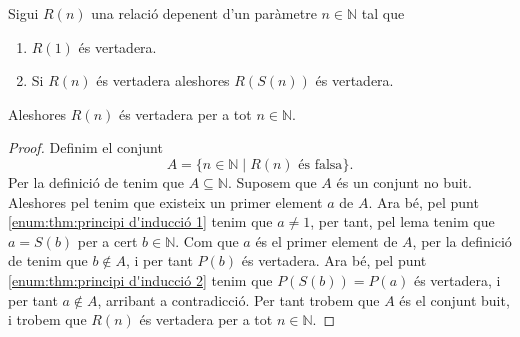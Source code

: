 \documentclass[../../Main.tex]{subfiles}
\begin{document}
	\begin{theorem}
		\label{thm:principi d'inducció}
		Sigui \(R(n)\) una relació depenent d'un paràmetre \(n\in\mathbb{N}\) tal que
		\begin{enumerate}
			\item\label{enum:thm:principi d'inducció 1} \(R(1)\) és vertadera.
			\item\label{enum:thm:principi d'inducció 2} Si \(R(n)\) és vertadera aleshores \(R(S(n))\) és vertadera.
		\end{enumerate}
		Aleshores \(R(n)\) és vertadera per a tot \(n\in\mathbb{N}\).
		\begin{proof}
			Definim el conjunt
			\[A=\{n\in\mathbb{N}\mid R(n)\text{ és falsa}\}.\]
			Per la definició de  tenim que \(A\subseteq\mathbb{N}\). Suposem que \(A\) és un conjunt no buit. Aleshores pel  tenim que existeix un primer element \(a\) de \(A\). Ara bé, pel punt \eqref{enum:thm:principi d'inducció 1} tenim que \(a\neq1\), per tant, pel lema  tenim que \(a=S(b)\) per a cert \(b\in\mathbb{N}\). Com que \(a\) és el primer element de \(A\), per la definició de  tenim que \(b\notin A\), i per tant \(P(b)\) és vertadera. Ara bé, pel punt \eqref{enum:thm:principi d'inducció 2} tenim que \(P(S(b))=P(a)\) és vertadera, i per tant \(a\notin A\), arribant a contradicció. Per tant trobem que \(A\) és el conjunt buit, i trobem que \(R(n)\) és vertadera per a tot \(n\in\mathbb{N}\).
		\end{proof}
	\end{theorem}
\end{document}

